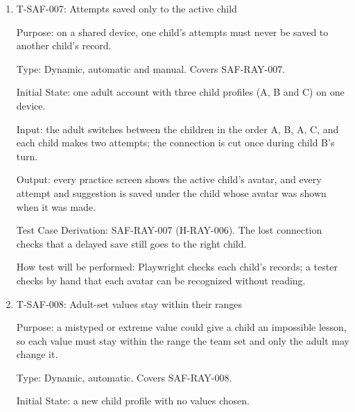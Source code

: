 \documentclass[12pt, titlepage]{article}
\newcommand{\testitem}[1]{\item #1\par\nopagebreak}
\begin{document}
\begin{enumerate}
Input: the adult starts the lesson and it is run until it ends at the
limit; the adult then starts the same lesson again, and this is repeated so
the lesson is done three times. In the third run, an improving sequence
earns an extension before the lesson ends at the limit.

Output: the adult's view of that lesson shows three lesson records, each
ending at the limit, one extension, and every attempt from all three
records.

Example: the adult sees ``ended at the limit: 3 times; extended: once'' and
all 6 + 6 + 8 = 20 attempts.

Test Case Derivation: SAF-RAY-006 (H-RAY-005).

How test will be performed: the script compares the counts and the list of
attempts in the adult's view with the runs made.

\testitem{T-SAF-007: Attempts saved only to the active child}

Purpose: on a shared device, one child's attempts must never be saved to
another child's record.

Type: Dynamic, automatic and manual. Covers SAF-RAY-007.

Initial State: one adult account with three child profiles (A, B and C) on
one device.

Input: the adult switches between the children in the order A, B, A, C,
and each child makes two attempts; the connection is cut once during child
B's turn.

Output: every practice screen shows the active child's avatar, and every
attempt and suggestion is saved under the child whose avatar was shown when
it was made.

Test Case Derivation: SAF-RAY-007 (H-RAY-006). The lost connection checks
that a delayed save still goes to the right child.

How test will be performed: Playwright checks each child's records; a
tester checks by hand that each avatar can be recognized without reading.

\testitem{T-SAF-008: Adult-set values stay within their ranges}

Purpose: a mistyped or extreme value could give a child an impossible
lesson, so each value must stay within the range the team set and only the
adult may change it.

Type: Dynamic, automatic. Covers SAF-RAY-008.

Initial State: a new child profile with no values chosen.


\end{enumerate}
\end{document}
